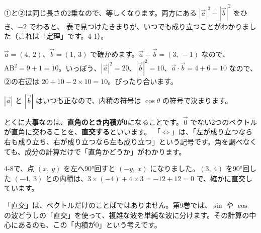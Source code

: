 ①と②は同じ長さの2乗なので、等しくなります。両方にある $|\vec{a}|^2+|\vec{b}|^2$ をひき、$-2$ でわると、
表で見つけたきまりが、いつでも成り立つことがわかりました（これは「定理」です。4-1）。

$\vec{a}=(4,\ 2)$、$\vec{b}=(1,\ 3)$ で確かめます。$\vec{a}-\vec{b}=(3,\ -1)$ なので、$\mathrm{AB}^2=9+1=10$。いっぽう、$|\vec{a}|^2=20$、$|\vec{b}|^2=10$、$\vec{a}\cdot\vec{b}=4+6=10$ なので、②の右辺は $20+10-2\times10=10$。ぴったり合います。


\label{bk:4-12:chokkou}$|\vec{a}|$ と $|\vec{b}|$ はいつも正なので、内積の符号は $\cos\theta$ の符号で決まります。

\begin{bkfigure}
\end{bkfigure}

とくに大事なのは、\textbf{直角のとき内積が0}になることです。$\vec{0}$ でない2つのベクトルが直角に交わることを、\textbf{直交する}といいます。
「$\Longleftrightarrow$」は、「左が成り立つなら右も成り立ち、右が成り立つなら左も成り立つ」という記号です。角を調べなくても、成分の計算だけで「直角かどうか」がわかります。

4-8で、点 $(x,\ y)$ を左へ90°回すと $(-y,\ x)$ になりました。$(3,\ 4)$ を90°回した $(-4,\ 3)$ との内積は、$3\times(-4)+4\times3=-12+12=0$ で、確かに直交しています。

「直交」は、ベクトルだけのことばではありません。第9巻では、$\sin$ や $\cos$ の波どうしの「直交」を使って、複雑な波を単純な波に分けます。その計算の中心にあるのも、この「内積が0」という考えです。

